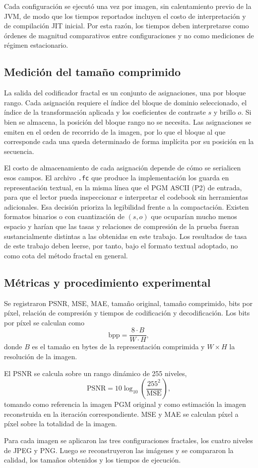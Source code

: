 Cada configuración se ejecutó una vez por imagen, sin calentamiento previo de la JVM, de modo que los tiempos reportados incluyen el costo de interpretación y de compilación JIT inicial. Por esta razón, los tiempos deben interpretarse como órdenes de magnitud comparativos entre configuraciones y no como mediciones de régimen estacionario.

\subsection{Medición del tamaño comprimido}
\label{sec:tamano_comprimido}

La salida del codificador fractal es un conjunto de asignaciones, una por bloque rango. Cada asignación requiere el índice del bloque de dominio seleccionado, el índice de la transformación aplicada y los coeficientes de contraste $s$ y brillo $o$. Si bien se almacena, la posición del bloque rango no se necesita. Las asignaciones se emiten en el orden de recorrido de la imagen, por lo que el bloque al que corresponde cada una queda determinado de forma implícita por su posición en la secuencia.

El costo de almacenamiento de cada asignación depende de cómo se serialicen esos campos. El archivo \texttt{.fc} que produce la implementación los guarda en representación textual, en la misma línea que el PGM ASCII (P2) de entrada, para que el lector pueda inspeccionar e interpretar el codebook sin herramientas adicionales. Esa decisión prioriza la legibilidad frente a la compactación. Existen formatos binarios o con cuantización de $(s,o)$ que ocuparían mucho menos espacio y harían que las tasas y relaciones de compresión de la prueba fueran sustancialmente distintas a las obtenidas en este trabajo. Los resultados de tasa de este trabajo deben leerse, por tanto, bajo el formato textual adoptado, no como cota del método fractal en general.

\subsection{Métricas y procedimiento experimental}

Se registraron PSNR, MSE, MAE, tamaño original, tamaño comprimido, bits por píxel, relación de compresión y tiempos de codificación y decodificación. Los bits por píxel se calculan como
\[
\mathrm{bpp} = \frac{8 \cdot B}{W \cdot H},
\]
donde $B$ es el tamaño en bytes de la representación comprimida y $W \times H$ la resolución de la imagen.

El PSNR se calcula sobre un rango dinámico de 255 niveles,
\[
\mathrm{PSNR} = 10 \log_{10}\!\left(\frac{255^{2}}{\mathrm{MSE}}\right),
\]
tomando como referencia la imagen PGM original y como estimación la imagen reconstruida en la iteración correspondiente. MSE y MAE se calculan píxel a píxel sobre la totalidad de la imagen.

Para cada imagen se aplicaron las tres configuraciones fractales, los cuatro niveles de JPEG y PNG. Luego se reconstruyeron las imágenes y se compararon la calidad, los tamaños obtenidos y los tiempos de ejecución.
